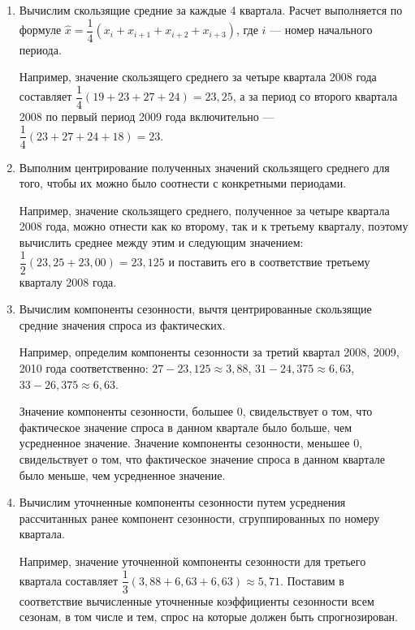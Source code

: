 \begin{enumerate}
\item Вычислим скользящие средние за каждые 4 квартала.
  Расчет выполняется по формуле
  \( \hat{x} = \dfrac{1}{4} (x_{i} + x_{i+1} + x_{i+2} + x_{i+3}) \),
  где \( i \) --- номер начального периода.

  Например, значение скользящего среднего за четыре квартала
  2008 года составляет \( \dfrac{1}{4} (19 + 23 + 27 + 24) = 23{,}25 \),
  а за период со второго квартала 2008 по первый период 2009 года
  включительно --- \( \dfrac{1}{4} (23 + 27 + 24 + 18) = 23 \).

\item Выполним центрирование полученных значений скользящего среднего
  для того, чтобы их можно было соотнести с конкретными периодами.

  Например, значение скользящего среднего, полученное за четыре квартала
  2008 года, можно отнести как ко второму, так и к третьему кварталу,
  поэтому вычислить среднее между этим и следующим значением:
  \( \dfrac{1}{2} (23{,}25 + 23{,}00) = 23{,}125 \) и поставить его
  в соответствие третьему кварталу 2008 года.

\item Вычислим компоненты сезонности,
  вычтя центрированные скользящие средние значения спроса из фактических.

  Например, определим компоненты сезонности за третий квартал
  2008, 2009, 2010 года соответственно:
  \( 27 - 23{,}125 \approx 3{,}88 \),
  \( 31 - 24{,}375 \approx 6{,}63 \),
  \( 33 - 26{,}375 \approx 6{,}63 \).
  
  Значение компоненты сезонности, большее 0, свидельствует о том, что
  фактическое значение спроса в данном квартале было больше,
  чем усредненное значение.
  Значение компоненты сезонности, меньшее 0, свидельствует о том, что
  фактическое значение спроса в данном квартале было меньше,
  чем усредненное значение.

\item Вычислим уточненные компоненты сезонности путем усреднения
  рассчитанных ранее компонент сезонности,
  сгруппированных по номеру квартала.

  Например, значение уточненной компоненты сезонности для третьего квартала составляет
  \( \dfrac{1}{3} (3{,}88 + 6{,}63 + 6{,}63) \approx 5{,}71 \).
  Поставим в соответствие
  вычисленные уточненные коэффициенты сезонности всем сезонам,
  в том числе и тем,
  спрос на которые должен быть спрогнозирован.


\end{enumerate}
